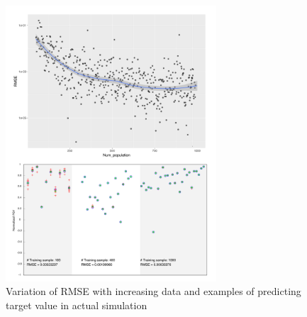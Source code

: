   \begin{figure}[ht]
    \centering
    \includegraphics[width=0.7\textwidth]{figures/pdf/Figure_ANN_num_training_data_sens.pdf}
    \caption{Variation of RMSE with increasing data and examples of predicting target value in actual simulation}
    \label{fig:Figure_ANN_num_training_data_sens}
\end{figure}



